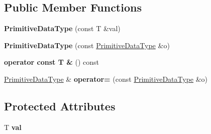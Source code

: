 \subsection*{Public Member Functions}
\begin{DoxyCompactItemize}
\item 
\hypertarget{class_assimp_1_1_s_t_e_p_1_1_e_x_p_r_e_s_s_1_1_primitive_data_type_a30c01e6cf496f00a5544fb78e1188903}{{\bfseries Primitive\+Data\+Type} (const T \&val)}\label{class_assimp_1_1_s_t_e_p_1_1_e_x_p_r_e_s_s_1_1_primitive_data_type_a30c01e6cf496f00a5544fb78e1188903}

\item 
\hypertarget{class_assimp_1_1_s_t_e_p_1_1_e_x_p_r_e_s_s_1_1_primitive_data_type_ae795e46794fee83d9dc887923fdaa7f3}{{\bfseries Primitive\+Data\+Type} (const \hyperlink{class_assimp_1_1_s_t_e_p_1_1_e_x_p_r_e_s_s_1_1_primitive_data_type}{Primitive\+Data\+Type} \&o)}\label{class_assimp_1_1_s_t_e_p_1_1_e_x_p_r_e_s_s_1_1_primitive_data_type_ae795e46794fee83d9dc887923fdaa7f3}

\item 
\hypertarget{class_assimp_1_1_s_t_e_p_1_1_e_x_p_r_e_s_s_1_1_primitive_data_type_a65f2e226a0857249e04abd18dc7b6f7b}{{\bfseries operator const T \&} () const }\label{class_assimp_1_1_s_t_e_p_1_1_e_x_p_r_e_s_s_1_1_primitive_data_type_a65f2e226a0857249e04abd18dc7b6f7b}

\item 
\hypertarget{class_assimp_1_1_s_t_e_p_1_1_e_x_p_r_e_s_s_1_1_primitive_data_type_afca2bf7543931ad6b73a1fcf604294c0}{\hyperlink{class_assimp_1_1_s_t_e_p_1_1_e_x_p_r_e_s_s_1_1_primitive_data_type}{Primitive\+Data\+Type} \& {\bfseries operator=} (const \hyperlink{class_assimp_1_1_s_t_e_p_1_1_e_x_p_r_e_s_s_1_1_primitive_data_type}{Primitive\+Data\+Type} \&o)}\label{class_assimp_1_1_s_t_e_p_1_1_e_x_p_r_e_s_s_1_1_primitive_data_type_afca2bf7543931ad6b73a1fcf604294c0}

\end{DoxyCompactItemize}
\subsection*{Protected Attributes}
\begin{DoxyCompactItemize}
\item 
\hypertarget{class_assimp_1_1_s_t_e_p_1_1_e_x_p_r_e_s_s_1_1_primitive_data_type_a627b933ab57ca92d7cb2ea5b1acae927}{T {\bfseries val}}\label{class_assimp_1_1_s_t_e_p_1_1_e_x_p_r_e_s_s_1_1_primitive_data_type_a627b933ab57ca92d7cb2ea5b1acae927}

\end{DoxyCompactItemize}
